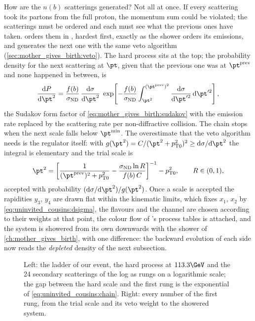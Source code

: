 How are the $n(b)$ scatterings generated? Not all at once. If every
scattering took its partons from the full proton, the momentum sum could be
violated; the scatterings must be ordered and each must see what the
previous ones have taken. \PYTHIA orders them in \pt, hardest first, exactly
as the shower orders its emissions, and generates the next one with the
same veto algorithm (\cref{sec:mother_gives_birth:veto}). The hard process
sits at the top; the probability density for the next scattering at
$\pt$, given that the previous one was at $\pt^{\mathrm{prev}}$ and none
happened in between, is
\begin{equation}
  \frac{\mathrm{d}P}{\mathrm{d}\pt^2}=\frac{f(b)}{\signd}\,\frac{\mathrm{d}\sigma}{\mathrm{d}\pt^2}\;
  \exp\!\left[-\frac{f(b)}{\signd}\int_{\pt^2}^{(\pt^{\mathrm{prev}})^2}\frac{\mathrm{d}\sigma}{\mathrm{d}\pt'^2}\,\mathrm{d}\pt'^2\right],
  \label{eq:uninvited_cousins:chain}
\end{equation}
the Sudakov form factor of \cref{eq:mother_gives_birth:sudakov} with the
emission rate replaced by the scattering rate per non-diffractive collision.
The chain stops when the next scale falls below $\pt^{\min}$. The
overestimate that the veto algorithm needs is the regulator itself: with
$g(\pt^2)=C/(\pt^2+\ptzero^2)^2\ge\mathrm{d}\sigma/\mathrm{d}\pt^2$ the
integral is elementary and the trial scale is
\begin{equation}
  \pt^2=\left[\frac{1}{(\pt^{\mathrm{prev}})^2+\ptzero^2}-\frac{\signd\ln R}{f(b)\,C}\right]^{-1}-\ptzero^2,
  \qquad R\in(0,1),
  \label{eq:uninvited_cousins:trial}
\end{equation}
accepted with probability $(\mathrm{d}\sigma/\mathrm{d}\pt^2)/g(\pt^2)$.
Once a scale is accepted the rapidities $y_3$, $y_4$ are drawn flat within
the kinematic limits, which fixes $x_1$, $x_2$ by
\cref{eq:uninvited_cousins:dsigma}, the flavours and the channel are
chosen according to their weights at that point, the colour flow of
\PYTHIA's process tables is attached, and the system is showered from its
own \pt downwards with the shower of \cref{ch:mother_gives_birth}, with one
difference: the backward evolution of each side now reads the
\emph{depleted} density of the next subsection.

\begin{figure}[htbp]\centering
\resizebox{\textwidth}{!}{}
\caption[The ladder of secondary scatterings and the first rung worked
out]{Left: the \pt ladder of our event, the hard process at $113.3\GeV$ and
the 24 secondary scatterings of the  log as rungs on a logarithmic
scale; the gap between the hard scale and the first rung is the exponential
of \cref{eq:uninvited_cousins:chain}. Right: every number of the first rung,
from the trial scale and its veto weight to the showered system.}
\label{fig:uninvited_cousins:chain_sketch}
\end{figure}

